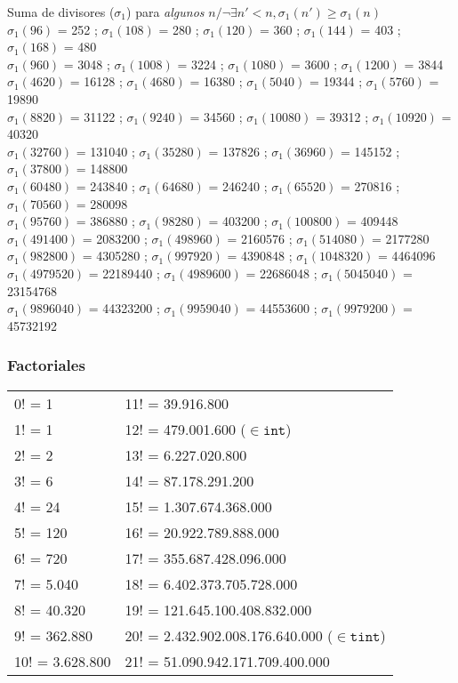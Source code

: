 \documentclass[10pt, landscape, twocolumn, a4paper, notitlepage]{article}
\begin{document}
%
Suma de divisores ($\sigma_1$) para \emph{algunos} $n / \neg\exists n'<n, \sigma_1(n') \geqslant \sigma_1(n)$ \\
$\sigma_1(96)$ = 252 ; $\sigma_1(108)$ = 280 ; $\sigma_1(120)$ = 360 ; $\sigma_1(144)$ = 403 ; $\sigma_1(168)$ = 480 \\
$\sigma_1(960)$ = 3048 ; $\sigma_1(1008)$ = 3224 ; $\sigma_1(1080)$ = 3600 ; $\sigma_1(1200)$ = 3844 \\
$\sigma_1(4620)$ = 16128 ; $\sigma_1(4680)$ = 16380 ; $\sigma_1(5040)$ = 19344 ; $\sigma_1(5760)$ = 19890 \\
$\sigma_1(8820)$ = 31122 ; $\sigma_1(9240)$ = 34560 ; $\sigma_1(10080)$ = 39312 ; $\sigma_1(10920)$ = 40320 \\
$\sigma_1(32760)$ = 131040 ; $\sigma_1(35280)$ = 137826 ; $\sigma_1(36960)$ = 145152 ; $\sigma_1(37800)$ = 148800 \\
$\sigma_1(60480)$ = 243840 ; $\sigma_1(64680)$ = 246240 ; $\sigma_1(65520)$ = 270816 ; $\sigma_1(70560)$ = 280098 \\
$\sigma_1(95760)$ = 386880 ; $\sigma_1(98280)$ = 403200 ; $\sigma_1(100800)$ = 409448  \\
$\sigma_1(491400)$ = 2083200 ; $\sigma_1(498960)$ = 2160576 ; $\sigma_1(514080)$ = 2177280 \\
$\sigma_1(982800)$ = 4305280 ; $\sigma_1(997920)$ = 4390848 ; $\sigma_1(1048320)$ = 4464096 \\
$\sigma_1(4979520)$ = 22189440 ; $\sigma_1(4989600)$ = 22686048 ; $\sigma_1(5045040)$ = 23154768 \\
$\sigma_1(9896040)$ = 44323200 ; $\sigma_1(9959040)$ = 44553600 ; $\sigma_1(9979200)$ = 45732192
%
%
\subsubsection{Factoriales}
\begin{tabular}{l|l}
0! =	1             & 11! = 39.916.800  \\
1! =	1             & 12! =	479.001.600	($\in \mathtt{int}$)\\
2! =	2             & 13! =	6.227.020.800	\\
3! =	6             & 14! =	87.178.291.200	\\
4! =	24            & 15! =	1.307.674.368.000	\\
5! =	120   			  & 16! =	20.922.789.888.000	\\
6! =	720           & 17! =	355.687.428.096.000	\\
7! =	5.040	        & 18! =	6.402.373.705.728.000	\\
8! =	40.320	      & 19! =	121.645.100.408.832.000	\\
9! =	362.880       & 20! =	2.432.902.008.176.640.000	($\in \mathtt{tint}$) \\
10! =	3.628.800     & 21! =	51.090.942.171.709.400.000
\end{tabular}
\end{document}
